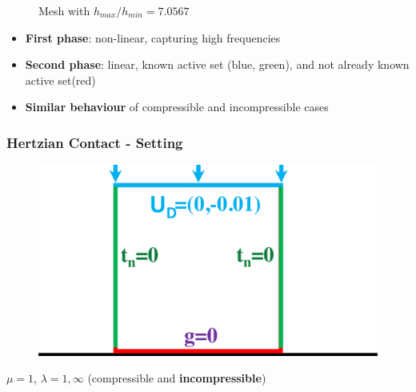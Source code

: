 \documentclass[8pt, oneside]{beamer}   	%
\newcommand{\titlecolor}[1]{\frametitle{\textcolor{dkgrey}{ \textbf{#1}}}}
\begin{document}
\begin{frame}
\begin{figure}[htbp!]
	\caption{Mesh with $h_{max}/h_{min}=7.0567$}
		\label{ResidualRateVeryNonUniform}
\end{figure}
\begin{itemize}
\item \textbf{First phase}: non-linear, capturing high frequencies
\item \textbf{Second phase}: linear, known active set (blue, green), and not already known active set(red)
\item  \textbf{Similar behaviour} of compressible and incompressible cases
\end{itemize}
\end{frame}


\begin{frame}
\titlecolor{Hertzian Contact - Setting}
\begin{figure}[htbp!]
\includegraphics[scale=0.2]{img/signorinisquare.pdf} 
\end{figure}
$ \mu = 1$, $ \lambda = 1, \infty$ (compressible and \textbf{incompressible})
\end{frame}
\end{document}
